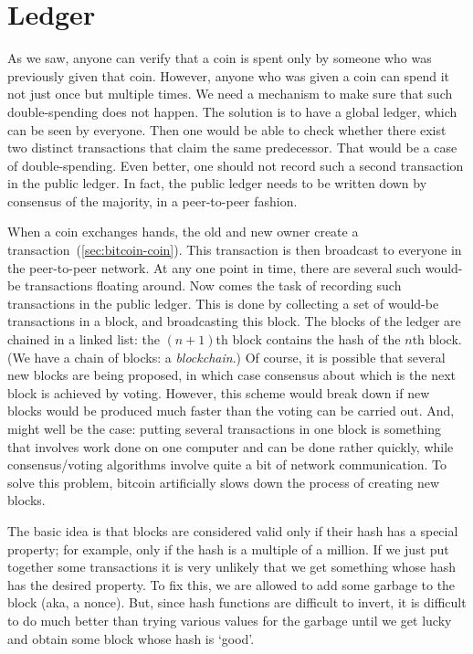 \section{Ledger}\label{sec:bitcoin-ledger}

As we saw, anyone can verify that a coin is spent only by someone who was previously given that coin.
However, anyone who was given a coin can spend it not just once but multiple times.
We need a mechanism to make sure that such double-spending does not happen.
The solution is to have a global ledger, which can be seen by everyone.
Then one would be able to check whether there exist two distinct transactions that claim the same predecessor.
That would be a case of double-spending.
Even better, one should not record such a second transaction in the public ledger.
In fact, the public ledger needs to be written down by consensus of the majority, in a peer-to-peer fashion.

When a coin exchanges hands, the old and new owner create a transaction~(\autoref{sec:bitcoin-coin}).
This transaction is then broadcast to everyone in the peer-to-peer network.
At any one point in time, there are several such would-be transactions floating around.
Now comes the task of recording such transactions in the public ledger.
This is done by collecting a set of would-be transactions in a block, and broadcasting this block.
The blocks of the ledger are chained in a linked list: the $(n+1)$th block contains the hash of the $n$th block.
(We have a chain of blocks: a \emph{blockchain}.)
Of course, it is possible that several new blocks are being proposed, in which case consensus about which is the next block is achieved by voting.
However, this scheme would break down if new blocks would be produced much faster than the voting can be carried out.
And, might well be the case: putting several transactions in one block is something that involves work done on one computer and can be done rather quickly, while consensus/voting algorithms involve quite a bit of network communication.
To solve this problem, bitcoin artificially slows down the process of creating new blocks.

The basic idea is that blocks are considered valid only if their hash has a special property; for example, only if the hash is a multiple of a million.
If we just put together some transactions it is very unlikely that we get something whose hash has the desired property.
To fix this, we are allowed to add some garbage to the block (aka, a nonce).
But, since hash functions are difficult to invert, it is difficult to do much better than trying various values for the garbage until we get lucky and obtain some block whose hash is `good'.

